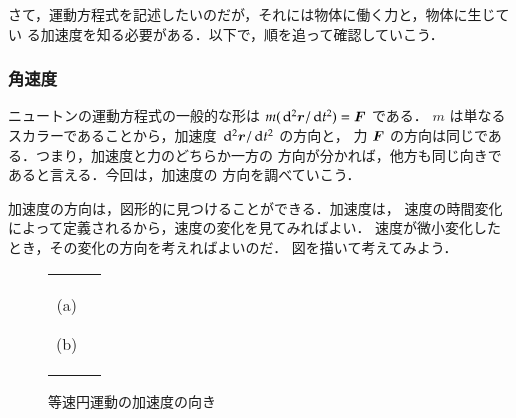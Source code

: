                 さて，運動方程式を記述したいのだが，それには物体に働く力と，物体に生じてい
                る加速度を知る必要がある．以下で，順を追って確認していこう．


            \subsubsection{角速度}
                ニュートンの運動方程式の一般的な形は $m(\,\mathrm{d}^{2}\boldsymbol{r}/\,\mathrm{d} t^{2})=\boldsymbol{F}$ である．
                $m$ は単なるスカラーであることから，加速度 $\,\mathrm{d}^{2}\boldsymbol{r}/\,\mathrm{d} t^{2}$ の方向と，
                力 $\boldsymbol{F}$ の方向は同じである．つまり，加速度と力のどちらか一方の
                方向が分かれば，他方も同じ向きであると言える．今回は，加速度の
                方向を調べていこう．

                加速度の方向は，図形的に見つけることができる．加速度は，
                速度の時間変化によって定義されるから，速度の変化を見てみればよい．
                速度が微小変化したとき，その変化の方向を考えればよいのだ．
                図を描いて考えてみよう．
                    \begin{figure}[hbt]
                        \begin{tabular}{cc}
                            \begin{minipage}{0.5\hsize}
                                    \begin{center}
                                                {tousokuenundou_kasokudo.pdf}
                                                \label{fig:tousokuenundou_kasokudo}

                                        (a)
                                    \end{center}
                            \end{minipage}
                            \begin{minipage}{0.5\hsize}
                                    \begin{center}
                                        {enundou_kasokudo.pdf}
                                        \label{fig:enundou_kasokudo}

                                        (b)
                                    \end{center}
                            \end{minipage}
                        \end{tabular}
                                \caption{等速円運動の加速度の向き}
                    \end{figure}

